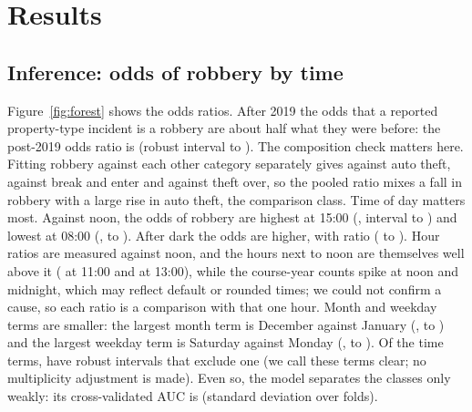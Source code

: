 \section{Results}
\subsection{Inference: odds of robbery by time}
Figure~\ref{fig:forest} shows the odds ratios. After 2019 the odds that a reported property-type incident is a robbery are about half what they were before: the post-2019 odds ratio is  (robust \pct{} interval  to ). The composition check matters here. Fitting robbery against each other category separately gives   against auto theft,   against break and enter and   against theft over, so the pooled ratio mixes a fall in robbery with a large rise in auto theft, the comparison class. Time of day matters most. Against noon, the odds of robbery are highest at 15:00 (, interval  to ) and lowest at 08:00 (,  to ). After dark the odds are higher, with ratio  ( to ). Hour ratios are measured against noon, and the hours next to noon are themselves well above it ( at 11:00 and  at 13:00), while the course-year counts spike at noon and midnight, which may reflect default or rounded times; we could not confirm a cause, so each ratio is a comparison with that one hour. Month and weekday terms are smaller: the largest month term is December against January (,  to ) and the largest weekday term is Saturday against Monday (,  to ). Of the  time terms,  have robust intervals that exclude one (we call these terms clear; no multiplicity adjustment is made). Even so, the model separates the classes only weakly: its cross-validated AUC is  (standard deviation  over folds).

